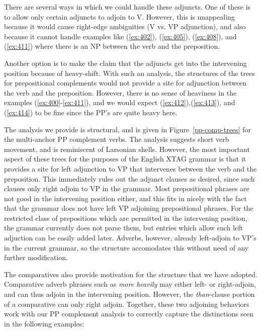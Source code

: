  
There are several ways in which we could handle these adjuncts.  One of 
these is to allow only certain adjuncts to adjoin to V.  However, this is 
unappealing because it would cause right-edge ambiguities (V vs. VP 
adjunction), and also because it cannot handle examples like (\ref{ex:402}), 
(\ref{ex:405}), (\ref{ex:408}), and (\ref{ex:411}) where there is an NP between the verb 
and the preposition. 
 
Another option is to make the claim that the adjuncts get into the 
intervening position because of heavy-shift. With such an analysis, the 
structures of the trees for prepositional complements would not provide a 
site for adjunction between the verb and the preposition.  However, there 
is no sense of heaviness in the examples (\ref{ex:400}-\ref{ex:411}), and we would 
expect (\ref{ex:412}),(\ref{ex:413}), and (\ref{ex:414}) to be fine since the PP's are 
quite heavy here. 
 
The analysis we provide is structural, and is given in 
Figure~\ref{pp-comp-trees} for the multi-anchor PP complement verbs.  The 
analysis suggests short verb movement, and is reminiscent of Larsonian 
shells. 
However, the most important aspect of these trees for the purposes 
of the English XTAG grammar is that it provides a site for left adjunction 
to VP that intervenes between the verb and the preposition.  This 
immediately rules out the adjunct clauses as desired, since such clauses 
only right adjoin to VP in the grammar.  Most prepositional phrases are not 
good in the intervening position either, and this fits in nicely with the 
fact that the grammar does not have left VP adjoining prepositional 
phrases.  For the restricted class of prepositions which are permitted in 
the intervening position, the grammar currently does not parse them, but 
entries which allow such left adjuction can be easily added later. 
Adverbs, however, already left-adjoin to VP's in the current grammar, so 
the structure accomodates this without need of any further modification. 
 
The comparatives also provide motivation for the structure that we have 
adopted. Comparative adverb phrases such as {\it more heavily} may either 
left- or right-adjoin, and can thus adjoin in the 
intervening position.  However, the {\it than}-clause portion of a 
comparative can only right adjoin. Together, these two adjoining 
behaviors work with our PP complement analysis to correctly capture the 
distinctions seen in the following examples: 
 

